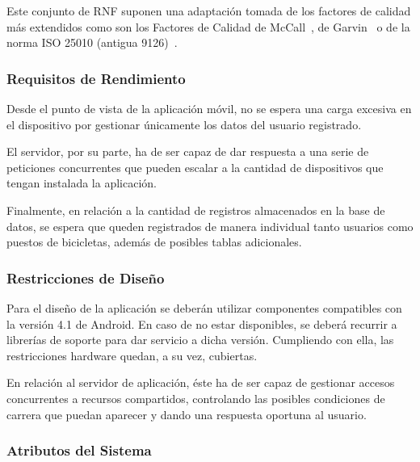 Este conjunto de RNF suponen una adaptación tomada de los factores de calidad más extendidos como son los Factores de Calidad de McCall~\cite{McC77}, de Garvin~\cite{Gar87} o de la norma ISO 25010 (antigua 9126)~\cite{ISO25}.

\subsubsection{Requisitos de Rendimiento}

Desde el punto de vista de la aplicación móvil, no se espera una carga excesiva en el dispositivo por gestionar únicamente los datos del usuario registrado.

El servidor, por su parte, ha de ser capaz de dar respuesta a una serie de peticiones concurrentes que pueden escalar a la cantidad de dispositivos que tengan instalada la aplicación.

Finalmente, en relación a la cantidad de registros almacenados en la base de datos, se espera que queden registrados de manera individual tanto usuarios como puestos de bicicletas, además de posibles tablas adicionales.

\subsubsection{Restricciones de Diseño}

Para el diseño de la aplicación se deberán utilizar componentes compatibles con la versión 4.1 de Android. En caso de no estar disponibles, se deberá recurrir a librerías de soporte para dar servicio a dicha versión. Cumpliendo con ella, las restricciones hardware quedan, a su vez, cubiertas.

En relación al servidor de aplicación, éste ha de ser capaz de gestionar accesos concurrentes a recursos compartidos, controlando las posibles condiciones de carrera que puedan aparecer y dando una respuesta oportuna al usuario. 

\subsubsection{Atributos del Sistema}

